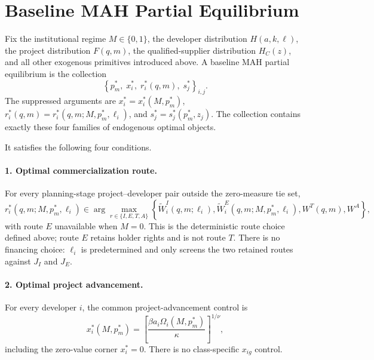 \section{Baseline MAH Partial Equilibrium}
\label{sec:p07-equilibrium}

Fix the institutional regime \(M\in\{0,1\}\), the developer distribution
\(H(a,k,\ell)\), the project distribution \(F(q,m)\), the qualified-supplier
distribution \(H_C(z)\), and all other exogenous primitives introduced above.
A baseline MAH partial equilibrium is the collection
\begin{equation}
  \boxed{
  \left\{
    p_m^*,\;
    x_i^*,\;
    r_i^*(q,m),\;
    s_j^*
  \right\}_{i,j}}
  .
  \label{eq:p07-equilibrium-collection}
\end{equation}
The suppressed arguments are \(x_i^*=x_i^*(M,p_m^*)\),
\(r_i^*(q,m)=r_i^*(q,m;M,p_m^*,\ell_i)\), and
\(s_j^*=s_j^*(p_m^*,z_j)\). The collection contains exactly these four
families of endogenous optimal objects.

It satisfies the following four conditions.

\paragraph{1. Optimal commercialization route.}
For every planning-stage project--developer pair outside the zero-measure tie
set,
\begin{equation}
  r_i^*(q,m;M,p_m^*,\ell_i)
  \in
  \arg\max_{r\in\{I,E,T,A\}}
  \left\{
    \widetilde W_i^I(q,m;\ell_i),
    \widetilde W_i^E(q,m;M,p_m^*,\ell_i),
    W^T(q,m),
    W^A
  \right\},
  \label{eq:p07-route-optimality}
\end{equation}
with route \(E\) unavailable when \(M=0\). This is the deterministic route
choice defined above; route \(E\) retains holder rights and is not route \(T\).
There is no financing choice: \(\ell_i\) is predetermined and only screens
the two retained routes against \(J_I\) and \(J_E\).

\paragraph{2. Optimal project advancement.}
For every developer \(i\), the common project-advancement control is
\begin{equation}
  x_i^*(M,p_m^*)
  =
  \left[
    \frac{\beta a_i\Omega_i(M,p_m^*)}{\kappa}
  \right]^{1/\nu},
  \label{eq:p07-advancement-optimality}
\end{equation}
including the zero-value corner \(x_i^*=0\). There is no class-specific
\(x_{ig}\) control.

